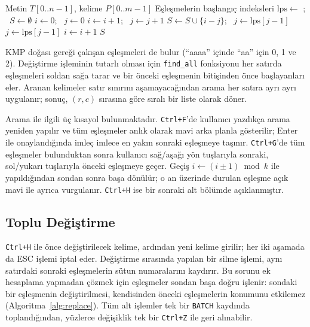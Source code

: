\documentclass[conference,a4paper]{IEEEtran}
\newcommand{\kod}[1]{\texttt{#1}}
\begin{document}
\begin{algorithm}[t]
\caption{KMP ile Tüm Eşleşmeleri Bulma}
\label{alg:kmp}
\begin{algorithmic}[1]
\Require Metin $T[0..n-1]$, kelime $P[0..m-1]$
\Ensure Eşleşmelerin başlangıç indeksleri
\State $\mathrm{lps} \gets$ ; \ $S \gets \emptyset$
\State $i \gets 0$; \ $j \gets 0$
    \State $i \gets i+1$; \ $j \gets j+1$
      \State $S \gets S \cup \{i - j\}$; \ $j \gets \mathrm{lps}[j-1]$
    \EndIf
    \State $j \gets \mathrm{lps}[j-1]$ 
  \Else
    \State $i \gets i+1$
  \EndIf
\EndWhile
\State \Return $S$
\end{algorithmic}
\end{algorithm}

KMP doğası gereği çakışan eşleşmeleri de bulur (``aaaa'' içinde ``aa'' için 0, 1 ve 2). Değiştirme işleminin tutarlı olması için \kod{find\_all} fonksiyonu her satırda eşleşmeleri soldan sağa tarar ve bir önceki eşleşmenin bitişinden önce başlayanları eler. Aranan kelimeler satır sınırını aşamayacağından arama her satıra ayrı ayrı uygulanır; sonuç, $(r,c)$ sırasına göre sıralı bir liste olarak döner.

Arama ile ilgili üç kısayol bulunmaktadır. \kod{Ctrl+F}'de kullanıcı yazdıkça arama yeniden yapılır ve tüm eşleşmeler anlık olarak mavi arka planla gösterilir; Enter ile onaylandığında imleç imlece en yakın sonraki eşleşmeye taşınır. \kod{Ctrl+G}'de tüm eşleşmeler bulunduktan sonra kullanıcı sağ/aşağı yön tuşlarıyla sonraki, sol/yukarı tuşlarıyla önceki eşleşmeye geçer. Geçiş $i \gets (i \pm 1) \bmod k$ ile yapıldığından sondan sonra başa dönülür; o an üzerinde durulan eşleşme açık mavi ile ayrıca vurgulanır. \kod{Ctrl+H} ise bir sonraki alt bölümde açıklanmıştır.

\subsection{Toplu Değiştirme}

\kod{Ctrl+H} ile önce değiştirilecek kelime, ardından yeni kelime girilir; her iki aşamada da ESC işlemi iptal eder. Değiştirme sırasında yapılan bir silme işlemi, aynı satırdaki sonraki eşleşmelerin sütun numaralarını kaydırır. Bu sorunu ek hesaplama yapmadan çözmek için eşleşmeler sondan başa doğru işlenir: sondaki bir eşleşmenin değiştirilmesi, kendisinden önceki eşleşmelerin konumunu etkilemez (Algoritma~\ref{alg:replace}). Tüm alt işlemler tek bir \kod{BATCH} kaydında toplandığından, yüzlerce değişiklik tek bir \kod{Ctrl+Z} ile geri alınabilir.
\end{document}
